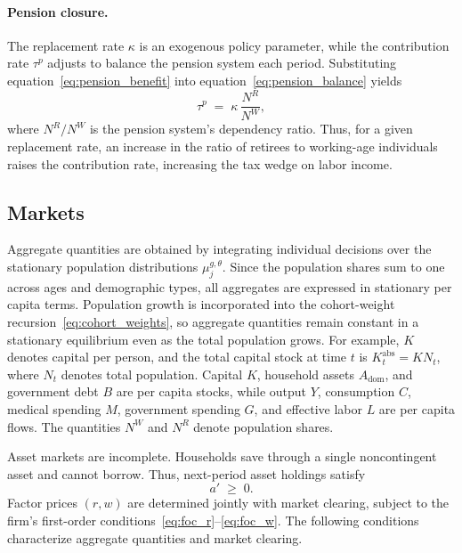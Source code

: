 \documentclass[12pt,a4paper]{article}
\begin{document}
\paragraph{Pension closure.}
The replacement rate $\kappa$ is an exogenous policy parameter, while the contribution rate $\tau^p$ adjusts to balance the pension system each period. Substituting equation~\eqref{eq:pension_benefit} into equation~\eqref{eq:pension_balance} yields
\begin{equation}
\label{eq:pension_contribution}
\tau^p \;=\; \kappa\, \frac{N^R}{N^W},
\end{equation}
where $N^R/N^W$ is the pension system's dependency ratio. Thus, for a given replacement rate, an increase in the ratio of retirees to working-age individuals raises the contribution rate, increasing the tax wedge on labor income.


\subsection{Markets}
\label{subsec:markets}

Aggregate quantities are obtained by integrating individual decisions over the stationary population distributions $\mu_j^{g,\theta}$. Since the population shares sum to one across ages and demographic types, all aggregates are expressed in stationary per capita terms. Population growth is incorporated into the cohort-weight recursion~\eqref{eq:cohort_weights}, so aggregate quantities remain constant in a stationary equilibrium even as the total population grows. For example, $K$ denotes capital per person, and the total capital stock at time $t$ is $K_t^{\mathrm{abs}} = K N_t$, where $N_t$ denotes total population. Capital $K$, household assets $A_{\mathrm{dom}}$, and government debt $B$ are per capita stocks, while output $Y$, consumption $C$, medical spending $M$, government spending $G$, and effective labor $L$ are per capita flows. The quantities $N^W$ and $N^R$ denote population shares.

Asset markets are incomplete. Households save through a single noncontingent asset and cannot borrow. Thus, next-period asset holdings satisfy
\begin{equation}
\label{eq:borrowing_constraint}
a' \;\geq\; 0.
\end{equation}
Factor prices $(r,w)$ are determined jointly with market clearing, subject to the firm's first-order conditions~\eqref{eq:foc_r}--\eqref{eq:foc_w}. The following conditions characterize aggregate quantities and market clearing.
\end{document}
